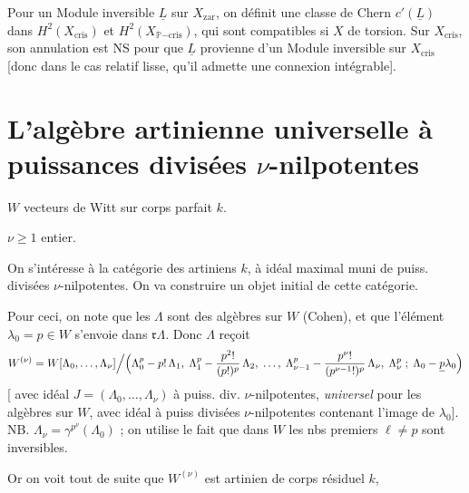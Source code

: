 \documentclass[11pt,a4paper]{article}
\begin{document}
Pour un Module inversible $\underline{L}$ sur $X_{\mathrm{zar}}$, on définit une
classe de Chern $c'(\underline{L})$ dans
$H^2(X_{\mathrm{cris}})$ et $H^2(X_{\mathbb{P}\mathrm{-cris}})$, qui sont
compatibles si $X$ de torsion. Sur $X_{\mathrm{cris}}$, son annulation est NS
pour que $\underline{L}$ provienne d'un Module inversible sur
$X_{\mathrm{cris}}$ [donc dans le cas relatif lisse,  qu'il admette
une connexion intégrable].

\section*{L'algèbre artinienne universelle à puissances divisées $\nu$-nilpotentes}


$W$ vecteurs de Witt sur corps parfait $k$.

$\nu \geq 1$ entier.

On s'intéresse à la catégorie des   artiniens
   $k$, à idéal maximal muni de
puiss. divisées $\nu$-nilpotentes. On va construire un objet initial de cette
catégorie.

Pour ceci, on note que les $\Lambda$ sont des algèbres sur $W$
(Cohen), et que l'élément $\lambda_0 = p \in W$ s'envoie dans
$\mathfrak{r}\Lambda$. Donc $\Lambda$ reçoit
\[
W^{(\nu)} = W[\Lambda_0, \dots, \Lambda_\nu] \Big/ \Big(\Lambda_0^{p} - p!\,\Lambda_1,\;
\Lambda_1^{p} - \frac{p^2!}{(p!)^{p}}\,\Lambda_2,\; \dots,\;
\Lambda_{\nu-1}^{p} - \frac{p^{\nu}!}{(p^{\nu-1}!)^{p}}\,\Lambda_\nu,\;
\Lambda_\nu^{p} \;;\; \Lambda_0 - \struck{p}\lambda_0\Big)
\]
[  avec idéal $J = (\Lambda_0, \dots, \Lambda_\nu)$ à
puiss. div. $\nu$-nilpotentes, \emph{universel} pour les algèbres sur $W$, avec
idéal à puiss divisées $\nu$-nilpotentes contenant l'image de $\lambda_0$]. NB.
$\Lambda_\nu = \gamma^{p^{\nu}}(\Lambda_0)$ ; on utilise le fait que dans $W$
les nbs premiers $\ell \neq p$ sont inversibles.

Or \struck{\ill{}} on voit tout de suite que $W^{(\nu)}$ est artinien
 de corps résiduel $k$, 
\end{document}
